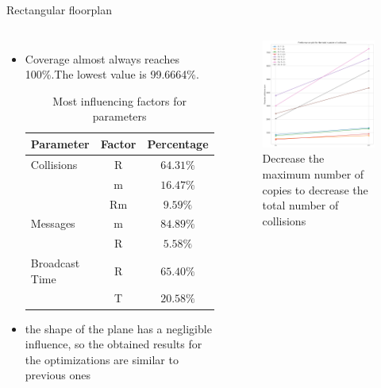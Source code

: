 \documentclass[aspectratio=169]{beamer}
\begin{document}
\begin{frame}{Rectangular floorplan}
		\begin{columns}
		 \begin{itemize}
		     \item
	Coverage almost always reaches 100\%.The lowest value is 99.6664\%. \\[5pt]

		\begin{table}
			\begin{tabular}{l | c | c}
				Parameter & Factor & Percentage \\
				\hline \hline
				Collisions & R & \(64.31 \%\) \\
				& m & \(16.47\%\) \\& Rm& \(9.59 \%\) \\
				\hline
				Messages & m & \(84.89\%\) \\& R & \(5.58\%\) \\
				\hline
				Broadcast Time & R & \(65.40\%\) \\
				& T & \(20.58\%\) \\
				\hline
			\end{tabular}
			\caption{Most influencing factors for parameters}
		\end{table}
		\item the shape of the plane has a negligible influence, so the obtained results for the optimizations are similar to previous ones
		\end{itemize}
				\begin{figure}
		    \includegraphics[height=0.65\textheight]{img/rect/collisions_m_perfplot.png}
		    \caption{Decrease the maximum number of copies to decrease the total
number of collisions}
		\end{figure}

	\end{columns}
\end{frame}
\end{document}
